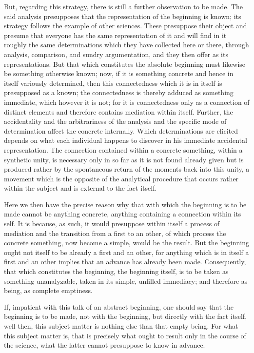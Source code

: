 But, regarding this strategy,
there is still a further observation to be made.
The said analysis presupposes that
the representation of the beginning is known;
its strategy follows the example of other sciences.
These presuppose their object and presume that
everyone has the same representation of it
and will find in it roughly the same determinations
which they have collected here or there,
through analysis, comparison, and sundry argumentation,
and they then offer as its representations.
But that which constitutes the absolute beginning must
likewise be something otherwise known;
now, if it is something concrete
and hence in itself variously determined,
then this connectedness which it is
in itself is presupposed as a known;
the connectedness is thereby adduced
as something immediate, which however it is not;
for it is connectedness only as
a connection of distinct elements
and therefore contains mediation within itself.
Further, the accidentality
and the arbitrariness of the analysis
and the specific mode of determination
affect the concrete internally.
Which determinations are elicited depends
on what each individual happens to discover
in his immediate accidental representation.
The connection contained within a concrete something,
within a synthetic unity, is necessary only in so far
as it is not found already given but is produced rather
by the spontaneous return of the moments back into this unity,
a movement which is the opposite of the analytical
procedure that occurs rather within the subject
and is external to the fact itself.

Here we then have the precise reason why
that with which the beginning is to be made
cannot be anything concrete,
anything containing a connection within its self.
It is because, as such, it would presuppose
within itself a process of mediation
and the transition from a first to an other,
of which process the concrete something,
now become a simple, would be the result.
But the beginning ought not itself to be
already a first and an other,
for anything which is
in itself a first and an other
implies that an advance has already been made.
Consequently, that which constitutes
the beginning, the beginning itself,
is to be taken as something unanalyzable,
taken in its simple, unfilled immediacy;
and therefore as being,
as complete emptiness.

If, impatient with this talk of an abstract beginning,
one should say that the beginning is to be made,
not with the beginning, but directly with the fact itself,
well then, this subject matter is nothing else
than that empty being.
For what this subject matter is,
that is precisely what ought to result
only in the course of the science,
what the latter cannot presuppose to know in advance.

